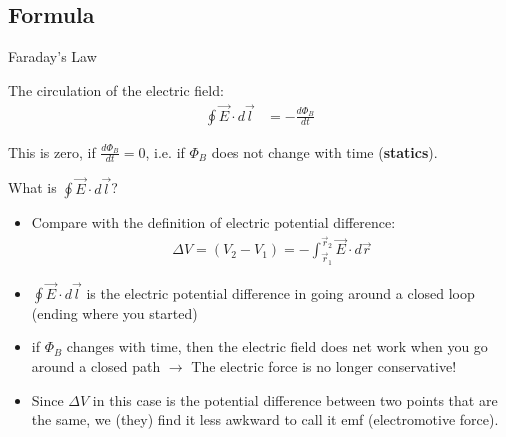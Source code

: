 \documentclass[aspectratio=169,
hyperref={colorlinks,urlcolor=blue}
]{beamer}
\begin{document}
\subsection{Formula}
\label{subsec:faradayformula}
\begin{bulletframe}{Faraday's Law}
\item The circulation of the electric field:
\begin{align*}
\oint \vec E \cdot d\vec l&= -\frac{d\Phi_B}{dt}
\end{align*}
\item This is zero, if $\frac{d\Phi_B}{dt}=0$, i.e. if $\Phi_B$  does not change with time (\textbf{statics}).
\pause
\item What is $\oint \vec E \cdot d\vec l$?
\begin{itemize}
\item Compare with the definition of electric potential difference:
\begin{align*}
\Delta V = (V_2-V_1) = -\int_{\vec r_1}^{\vec r_2}\vec E\cdot d\vec r
\end{align*}
\item $\oint \vec E \cdot d\vec l$ is the electric potential difference in going around a closed loop (ending where you started)
\item if $\Phi_B$  changes with time, then the electric field does net work when you go around a closed path $\rightarrow$ The electric force is no longer conservative!
\item Since $\Delta V$ in this case is the potential difference between two points that are the same, we (they) find it less awkward to call it emf (electromotive force).
\end{itemize}
\end{bulletframe}


\end{document}

